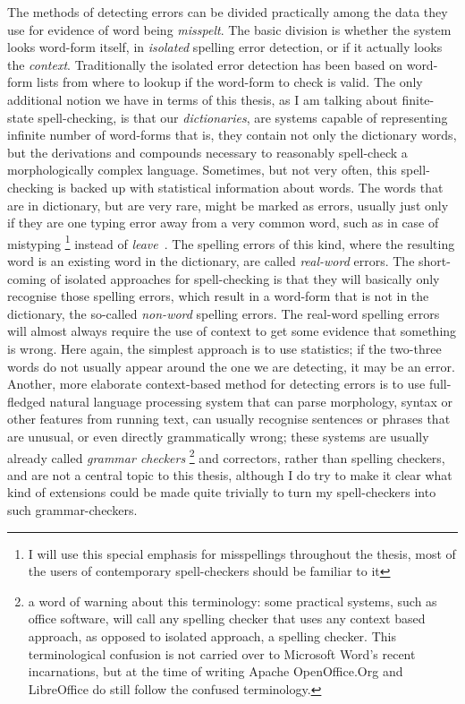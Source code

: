 \documentclass[officiallayout,draft]{unihelcompling}
\newcommand\misspelt{\bgroup\markoverwith
{\textcolor{red}{\lower3.5pt\hbox{\sixly \char58}}}\ULon}
\begin{document}
The methods of detecting errors can be divided practically among the data they
use for evidence of word being \emph{misspelt}. The basic division is whether
the system looks word-form itself, in \emph{isolated} spelling error detection,
or if it actually looks the \emph{context}. Traditionally the isolated error
detection has been based on word-form lists from where to lookup if the
word-form to check is valid. The only additional notion we have in terms of
this thesis, as I am talking about finite-state spell-checking, is that our
\emph{dictionaries}, are systems capable of representing infinite number of
word-forms that is, they contain not only the dictionary words, but the
derivations and compounds necessary to reasonably spell-check a morphologically
complex language. Sometimes, but not very often, this spell-checking is backed
up with statistical information about words. The words that are in dictionary,
but are very rare, might be marked as errors, usually just only if they are one
typing error away from a very common word, such as in case of mistyping
\misspelt{lave}\footnote{I will use this special emphasis for misspellings
    throughout the thesis, most of the users of contemporary spell-checkers
should be familiar to it} instead of \emph{leave}~\citep{kukich1992techniques}.
The spelling errors of this kind, where the resulting word is an existing word
in the dictionary, are called \emph{real-word} errors.  The short-coming of
isolated approaches for spell-checking is that they will basically only
recognise those spelling errors, which result in a word-form that is not in the
dictionary, the so-called \emph{non-word} spelling errors. The real-word
spelling errors will almost always require the use of context to get some
evidence that something is wrong. Here again, the simplest approach is to use
statistics; if the two-three words do not usually appear around the one we are
detecting, it may be an error. Another, more elaborate context-based method for
detecting errors is to use full-fledged natural language processing system that
can parse morphology, syntax or other features from running text, can usually
recognise sentences or phrases that are unusual, or even directly grammatically
wrong; these systems are usually already called \emph{grammar checkers}
\footnote{a word of warning about this terminology: some practical
    systems, such as office software, will call any spelling checker that uses
    any context based approach, as opposed to isolated approach, a spelling
checker. This terminological confusion is not carried over to Microsoft Word's
recent incarnations, but at the time of writing Apache OpenOffice.Org and
LibreOffice do still follow the confused terminology.} and
correctors, rather than spelling checkers, and are not a central topic to 
this thesis, although I do try to make it clear what kind of extensions could
be made quite trivially to turn my spell-checkers into such grammar-checkers.
\end{document}
